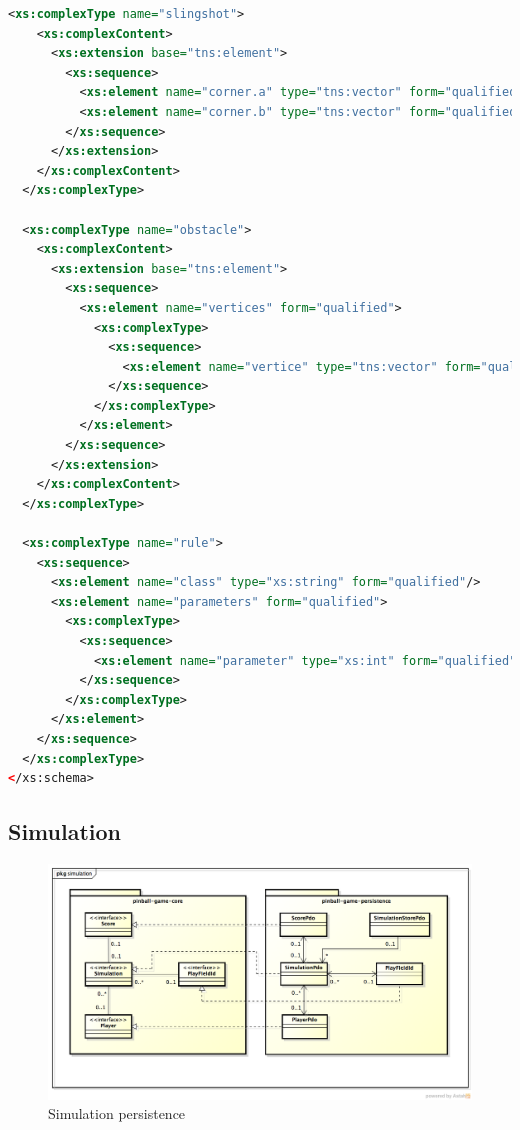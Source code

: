 \documentclass[fontsize=12pt,
               paper=a4,
               twoside=false,
               parskip=half,
               ]{scrartcl}
\begin{document}
\begin{lstlisting}[language=xml,label=lst:playfield_xsd,caption={playfield.xsd}]
  <xs:complexType name="slingshot">
    <xs:complexContent>
      <xs:extension base="tns:element">
        <xs:sequence>
          <xs:element name="corner.a" type="tns:vector" form="qualified"/>
          <xs:element name="corner.b" type="tns:vector" form="qualified"/>
        </xs:sequence>
      </xs:extension>
    </xs:complexContent>
  </xs:complexType>

  <xs:complexType name="obstacle">
    <xs:complexContent>
      <xs:extension base="tns:element">
        <xs:sequence>
          <xs:element name="vertices" form="qualified">
            <xs:complexType>
              <xs:sequence>
                <xs:element name="vertice" type="tns:vector" form="qualified" maxOccurs="unbounded"/>
              </xs:sequence>
            </xs:complexType>
          </xs:element>
        </xs:sequence>
      </xs:extension>
    </xs:complexContent>
  </xs:complexType>

  <xs:complexType name="rule">
    <xs:sequence>
      <xs:element name="class" type="xs:string" form="qualified"/>
      <xs:element name="parameters" form="qualified">
        <xs:complexType>
          <xs:sequence>
            <xs:element name="parameter" type="xs:int" form="qualified" maxOccurs="unbounded"/>
          </xs:sequence>
        </xs:complexType>
      </xs:element>
    </xs:sequence>
  </xs:complexType>
</xs:schema>
\end{lstlisting}


\subsection{Simulation}


\begin{figure}[H]
	\centering
	\includegraphics[width=15.5cm]{./img/persistence-simulation.png}
	\caption[Simulation persistence]{Simulation persistence}
	\label{fig:simulation_persistence}
\end{figure}
\end{document}
